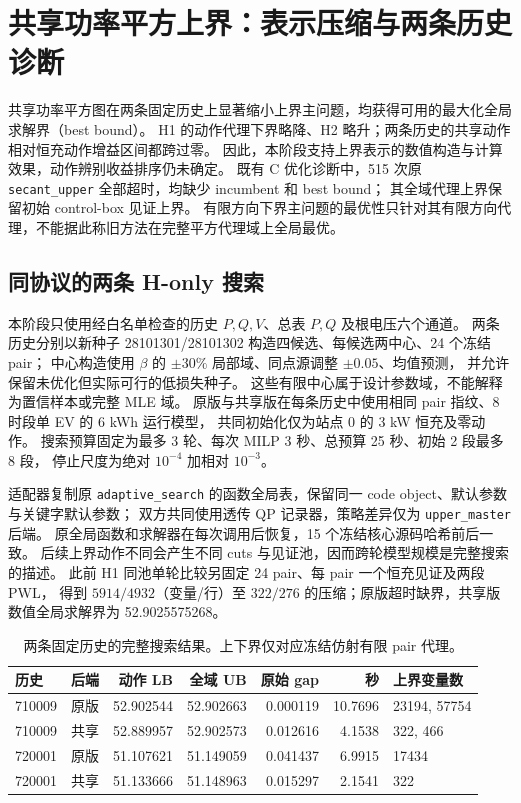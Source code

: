 \section{共享功率平方上界：表示压缩与两条历史诊断}
\label{sec:shared-power-square-upper}

共享功率平方图在两条固定历史上显著缩小上界主问题，均获得可用的最大化全局求解界（best bound）。
H1 的动作代理下界略降、H2 略升；两条历史的共享动作相对恒充动作增益区间都跨过零。
因此，本阶段支持上界表示的数值构造与计算效果，动作辨别收益排序仍未确定。
既有 C 优化诊断中，515 次原 \texttt{secant\_upper} 全部超时，均缺少 incumbent 和 best bound；
其全域代理上界保留初始 control-box 见证上界。
有限方向下界主问题的最优性只针对其有限方向代理，不能据此称旧方法在完整平方代理域上全局最优。

\subsection{同协议的两条 H-only 搜索}
本阶段只使用经白名单检查的历史 $P,Q,V$、总表 $P,Q$ 及根电压六个通道。
两条历史分别以新种子 28101301/28101302 构造四候选、每候选两中心、24 个冻结 pair；
中心构造使用 $\beta$ 的 $\pm30\%$ 局部域、同点源调整 $\pm0.05$、均值预测，
并允许保留未优化但实际可行的低损失种子。
这些有限中心属于设计参数域，不能解释为置信样本或完整 MLE 域。
原版与共享版在每条历史中使用相同 pair 指纹、8 时段单 EV 的 6 kWh 运行模型，
共同初始化仅为站点 0 的 3 kW 恒充及零动作。
搜索预算固定为最多 3 轮、每次 MILP 3 秒、总预算 25 秒、初始 2 段最多 8 段，
停止尺度为绝对 $10^{-4}$ 加相对 $10^{-3}$。

适配器复制原 \texttt{adaptive\_search} 的函数全局表，保留同一 code object、默认参数与关键字默认参数；
双方共同使用透传 QP 记录器，策略差异仅为 \texttt{upper\_master} 后端。
原全局函数和求解器在每次调用后恢复，15 个冻结核心源码哈希前后一致。
后续上界动作不同会产生不同 cuts 与见证池，因而跨轮模型规模是完整搜索的描述。
此前 H1 同池单轮比较另固定 24 pair、每 pair 一个恒充见证及两段 PWL，
得到 $5914/4932$（变量/行）至 $322/276$ 的压缩；原版超时缺界，共享版数值全局求解界为 52.9025575268。

\begin{table}[htbp]
\centering\small
\caption{两条固定历史的完整搜索结果。上下界仅对应冻结仿射有限 pair 代理。}
\label{tab:shared-upper-search}
\begin{tabular}{llrrrrl}
\hline
历史 & 后端 & 动作 LB & 全域 UB & 原始 gap & 秒 & 上界变量数 \\
\hline
710009 & 原版 & 52.902544 & 52.902663 & 0.000119 & 10.7696 & 23194, 57754 \\
710009 & 共享 & 52.889957 & 52.902573 & 0.012616 & 4.1538 & 322, 466 \\
720001 & 原版 & 51.107621 & 51.149059 & 0.041437 & 6.9915 & 17434 \\
720001 & 共享 & 51.133666 & 51.148963 & 0.015297 & 2.1541 & 322 \\
\hline
\end{tabular}
\end{table}

